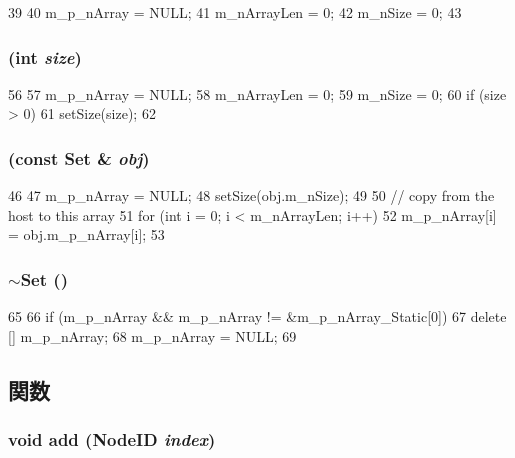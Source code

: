\begin{DoxyCode}
39 {
40     m_p_nArray = NULL;
41     m_nArrayLen = 0;
42     m_nSize = 0;
43 }
\end{DoxyCode}
\hypertarget{classSet_a4002084bb3b696e4d7208803d6778140}{
\subsubsection[{Set}]{ (int {\em size})}}
\label{classSet_a4002084bb3b696e4d7208803d6778140}



\begin{DoxyCode}
56 {
57     m_p_nArray = NULL;
58     m_nArrayLen = 0;
59     m_nSize = 0;
60     if (size > 0)
61         setSize(size);
62 }
\end{DoxyCode}
\hypertarget{classSet_a730402671835f0f3385ca4d591f03bbe}{
\subsubsection[{Set}]{ (const {\bf Set} \& {\em obj})}}
\label{classSet_a730402671835f0f3385ca4d591f03bbe}



\begin{DoxyCode}
46 {
47     m_p_nArray = NULL;
48     setSize(obj.m_nSize);
49 
50     // copy from the host to this array
51     for (int i = 0; i < m_nArrayLen; i++)
52         m_p_nArray[i] = obj.m_p_nArray[i];
53 }
\end{DoxyCode}
\hypertarget{classSet_a64c23991280aa719d76b8995d530115f}{
\subsubsection[{$\sim$Set}]{\setlength{\rightskip}{0pt plus 5cm}$\sim${\bf Set} ()}}
\label{classSet_a64c23991280aa719d76b8995d530115f}



\begin{DoxyCode}
65 {
66     if (m_p_nArray && m_p_nArray != &m_p_nArray_Static[0])
67         delete [] m_p_nArray;
68     m_p_nArray = NULL;
69 }
\end{DoxyCode}


\subsection{関数}
\hypertarget{classSet_a9d3c0a08ea232cfc4e207b1bc39d43c9}{
\subsubsection[{add}]{\setlength{\rightskip}{0pt plus 5cm}void add ({\bf NodeID} {\em index})}}
\label{classSet_a9d3c0a08ea232cfc4e207b1bc39d43c9}



